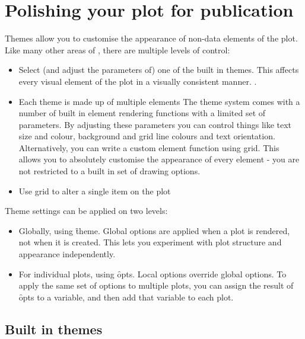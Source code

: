 

\chapter{Polishing your plot for publication}
\label{cha:theming}

Themes allow you to customise the appearance of non-data elements of the plot.  Like many other areas of \ggplot, there are multiple levels of control:

\begin{itemize}
  \item Select (and adjust the parameters of) one of the built in themes.  This affects every visual element of the plot in a visually consistent manner.  .

  \item Each theme is made up of multiple elements The theme system comes with a number of built in element rendering functions with a limited set of parameters.  By adjusting these parameters you can control things like text size and colour, background and grid line colours and text orientation. Alternatively, you can write a custom element function using grid.  This allows you to absolutely customise the appearance of every element - you are not restricted to a built in set of drawing options.  

  \item Use grid to alter a single item on the plot
\end{itemize}

\noindent Theme settings can be applied on two levels:

\begin{itemize}
  \item Globally, using \f{theme}.  Global options are applied when a plot is rendered, not when it is created.  This lets you experiment with plot structure and appearance independently.

  \item For individual plots, using \f{opts}.  Local options override global options.  To apply the same set of options to multiple plots, you can assign the result of \f{opts} to a variable, and then add that variable to each plot.
\end{itemize}

\section{Built in themes}
\label{sec:built_in}

